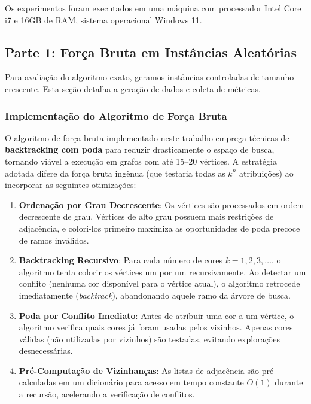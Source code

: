 \documentclass[12pt]{article}
\begin{document}
Os experimentos foram executados em uma máquina com processador Intel Core i7 e 16GB de RAM, sistema operacional Windows 11.

\subsection{Parte 1: Força Bruta em Instâncias Aleatórias}

Para avaliação do algoritmo exato, geramos instâncias controladas de tamanho crescente. Esta seção detalha a geração de dados e coleta de métricas.

\subsubsection{Implementação do Algoritmo de Força Bruta}

O algoritmo de força bruta implementado neste trabalho emprega técnicas de \textbf{backtracking com poda} para reduzir drasticamente o espaço de busca, tornando viável a execução em grafos com até 15--20 vértices. A estratégia adotada difere da força bruta ingênua (que testaria todas as $k^n$ atribuições) ao incorporar as seguintes otimizações:

\begin{enumerate}
    \item \textbf{Ordenação por Grau Decrescente}: Os vértices são processados em ordem decrescente de grau. Vértices de alto grau possuem mais restrições de adjacência, e colori-los primeiro maximiza as oportunidades de poda precoce de ramos inválidos.
    
    \item \textbf{Backtracking Recursivo}: Para cada número de cores $k = 1, 2, 3, \ldots$, o algoritmo tenta colorir os vértices um por um recursivamente. Ao detectar um conflito (nenhuma cor disponível para o vértice atual), o algoritmo retrocede imediatamente (\textit{backtrack}), abandonando aquele ramo da árvore de busca.
    
    \item \textbf{Poda por Conflito Imediato}: Antes de atribuir uma cor a um vértice, o algoritmo verifica quais cores já foram usadas pelos vizinhos. Apenas cores válidas (não utilizadas por vizinhos) são testadas, evitando explorações desnecessárias.
    
    \item \textbf{Pré-Computação de Vizinhanças}: As listas de adjacência são pré-calculadas em um dicionário para acesso em tempo constante $O(1)$ durante a recursão, acelerando a verificação de conflitos.
\end{enumerate}
\end{document}

